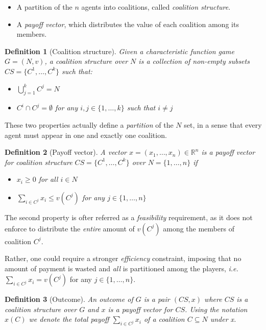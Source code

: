 \documentclass[11pt, twoside, titlepage, a4paper, openright]{report}
\newtheorem{Def}{Definition}
\begin{document}
\begin{itemize}
\item A partition of the $n$ agents into coalitions, called \textit{coalition structure}.
\item A \textit{payoff vector}, which distributes the value of each coalition among its members.
\end{itemize}

\begin{Def}[Coalition structure]
Given a characteristic function game $G=(N,v)$, a \textit{coalition structure over $N$} is a collection of non-empty subsets $CS=\{C^1,\ldots,C^k\}$ such that:
\begin{itemize}
\item $\bigcup _{j=1}^kC^j=N$
\item $C^i \cap C^j = \emptyset$ for any $i,j \in \{1,\ldots,k\}$ such that $i \neq j$
\end{itemize}
\end{Def}

\noindent These two properties actually define a \textit{partition} of the $N$ set, in a sense that every agent must appear in one and exactly one coalition.

\begin{Def}[Payoff vector]
A vector $x = (x_1,\ldots,x_n) \in \mathbb{R}^n$ is a \textit{payoff vector} for coalition structure $CS=\{C^1,\ldots,C^k\}$ over $N=\{1,\ldots,n\}$ if
\begin{itemize}
\item $x_i \ge 0$ for all $i \in N$
\item $\sum _{i \in C^j}x_i \leq v(C^j)$ for any $j \in \{1,\ldots,n\}$
\end{itemize}
\end{Def}

\noindent The second property is ofter referred as a \textit{feasibility} requirement, as it does not enforce to distribute the \textit{entire} amount of $v(C^j)$ among the members of coalition $C^j$. 

\noindent Rather, one could require a stronger \textit{efficiency} constraint, imposing that no amount of payment is wasted and \textit{all} is partitioned among the players, \textit{i.e.} $\sum _{i \in C^j}x_i = v(C^j)$ for any $j \in \{1,\ldots,n\}$.

\begin{Def}[Outcome]
An \textit{outcome} of $G$ is a pair $(CS,x)$ where $CS$ is a coalition structure over $G$ and $x$ is a payoff vector for $CS$. Using the notation $x(C)$ we denote the total payoff $\sum _{i \in C^j}x_i$ of a coalition $C \subseteq N$ under x.
\end{Def}
\end{document}
